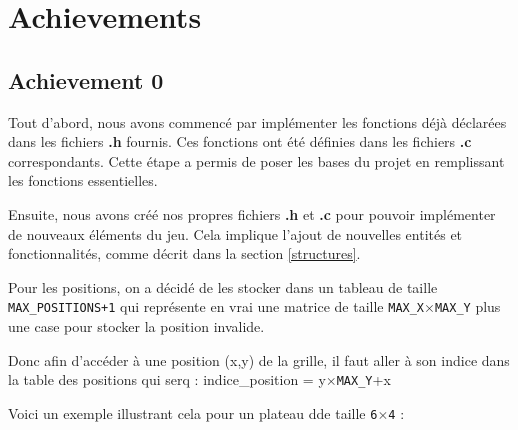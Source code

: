 \documentclass[a4paper,12pt]{report}
\begin{document}
\section{Achievements}
\subsection{Achievement 0}

Tout d'abord, nous avons commencé par implémenter les fonctions déjà déclarées dans les fichiers \textbf{.h} fournis. Ces fonctions ont été définies dans les fichiers \textbf{.c} correspondants. Cette étape a permis de poser les bases du projet en remplissant les fonctions essentielles.

Ensuite, nous avons créé nos propres fichiers \textbf{.h} et \textbf{.c} pour pouvoir implémenter de nouveaux éléments du jeu. Cela implique l'ajout de nouvelles entités et fonctionnalités, comme décrit dans la section \ref{structures}.

Pour les positions, on a décidé de les stocker dans un tableau de taille \texttt{MAX\_POSITIONS+1} qui représente en vrai une matrice de taille \texttt{MAX\_X}\(\times\)\texttt{MAX\_Y} plus une case pour stocker la position invalide.

Donc afin d'accéder à une position (x,y) de la grille, il faut aller à son indice dans la table des positions qui serq : indice\_position = y\(\times\)\texttt{MAX\_Y}+x

Voici un exemple illustrant cela pour un plateau dde taille \texttt{6}\(\times\)\texttt{4} :
\end{document}
